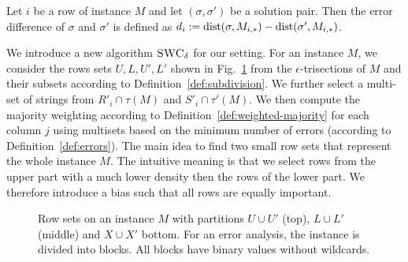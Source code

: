 \begin{definition}
   Let $i$ be a row of instance $M$ and let $(\sigma,\sigma')$ be a solution pair.
   Then the error difference of $\sigma$ and $\sigma'$ is defined as
   $d_i := \mathrm{dist}(\sigma,M_{i,*}) - \mathrm{dist}(\sigma',M_{i,*})$.
   \label{def:errors}
\end{definition}
%
We introduce a new algorithm $\textsc{SWC}_\delta$ for our setting.
For an instance $M$, we consider the rows sets $U, L, U', L'$ shown in Fig.~\ref{fig:section 2.1} from the $\epsilon$-trisections of $M$ and their subsets according to Definition~\ref{def:subdivision}.
We further select a multi-set of strings from $R'_i \cap \tau(M)$ and $S'_i \cap \tau'(M)$.
We then compute the majority weighting according to Definition~\ref{def:weighted-majority} for each column $j$ using 
multisets based on the minimum number of errors (according to Definition~\ref{def:errors}).
The main idea to find two small row sets that represent the whole instance $M$.
The intuitive meaning is that we select rows from the upper part with a much lower density then the rows of the lower part.
We therefore introduce a bias such that all rows are equally important.

\begin{figure}[h]
    \begin{center}
        \caption{\label{fig:section 2.1} Row sets on an instance $M$ with partitions $U \cup U'$ (top), $L \cup L'$ (middle) and $X \cup X'$ bottom. For an error analysis, the instance is divided into blocks. All blocks have binary values without wildcards.}
    \end{center}
\end{figure}

